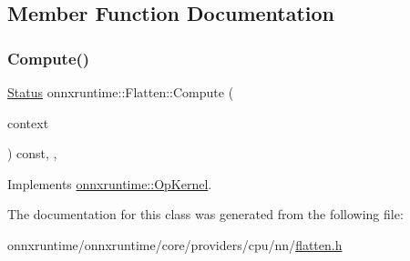 \subsection{Member Function Documentation}
\mbox{\label{classonnxruntime_1_1Flatten_a1e6a6099556acf9bdb3af019fdca96e2}} 
\subsubsection{\texorpdfstring{Compute()}{Compute()}}
{\footnotesize\ttfamily \mbox{\hyperlink{classonnxruntime_1_1common_1_1Status}{Status}} onnxruntime\+::\+Flatten\+::\+Compute (\begin{DoxyParamCaption}\item[{\mbox{\hyperlink{classonnxruntime_1_1OpKernelContext}{Op\+Kernel\+Context}} $\ast$}]{context }\end{DoxyParamCaption}) const\hspace{0.3cm}{\ttfamily [inline]}, {\ttfamily [override]}, {\ttfamily [virtual]}}



Implements \mbox{\hyperlink{classonnxruntime_1_1OpKernel_a9eca8656a78b1b3ab9d3351a12798650}{onnxruntime\+::\+Op\+Kernel}}.



The documentation for this class was generated from the following file\+:\begin{DoxyCompactItemize}
\item 
onnxruntime/onnxruntime/core/providers/cpu/nn/\mbox{\hyperlink{cpu_2nn_2flatten_8h}{flatten.\+h}}\end{DoxyCompactItemize}
